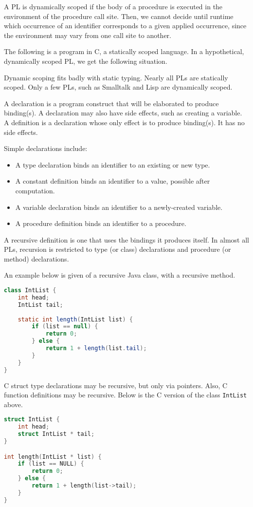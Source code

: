 \documentclass[a4paper, openany]{memoir}
\begin{document}
A PL is dynamically scoped if the body of a procedure is executed in the environment of the procedure call site. Then, we cannot decide until runtime which occurrence of an identifier corresponds to a given applied occurrence, since the environment may vary from one call site to another.

The following is a program in C, a statically scoped language.
In a hypothetical, dynamically scoped PL, we get the following situation.

Dynamic scoping fits badly with static typing. Nearly all PLs are statically scoped. Only a few PLs, such as Smalltalk and Lisp are dynamically scoped.

A declaration is a program construct that will be elaborated to produce binding(s). A declaration may also have side effects, such as creating a variable. A definition is a declaration whose only effect is to produce binding(s). It has no side effects.

Simple declarations include:
\begin{itemize}
    \item A type declaration binds an identifier to an existing or new type.
    \item A constant definition binds an identifier to a value, possible after computation.
    \item A variable declaration binds an identifier to a newly-created variable.
    \item A procedure definition binds an identifier to a procedure.
\end{itemize}

A recursive definition is one that uses the bindings it produces itself. In almost all PLs, recursion is restricted to type (or class) declarations and procedure (or method) declarations. 

An example below is given of a recursive Java class, with a recursive method.
\begin{lstlisting}[language=Java]
class IntList {
    int head;
    IntList tail;
    
    static int length(IntList list) {
        if (list == null) {
            return 0;
        } else {
            return 1 + length(list.tail);
        }
    }
}
\end{lstlisting}
C struct type declarations may be recursive, but only via pointers. Also, C function definitions may be recursive. Below is the C version of the class \texttt{IntList} above.
\begin{lstlisting}[language=C]
struct IntList {
    int head;
    struct IntList * tail;
}

int length(IntList * list) {
    if (list == NULL) {
        return 0;
    } else {
        return 1 + length(list->tail);
    }
}
\end{lstlisting}
\newpage
\end{document}
